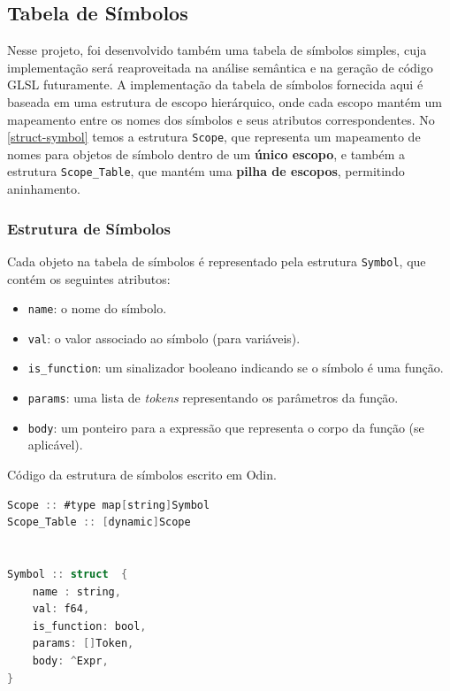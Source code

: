 \subsection{Tabela de Símbolos}


Nesse projeto, foi desenvolvido também uma tabela de símbolos simples, cuja implementação será reaproveitada na análise semântica e na geração de código GLSL futuramente. A implementação da tabela de símbolos fornecida aqui é baseada em uma estrutura de escopo hierárquico, onde cada escopo mantém um mapeamento entre os nomes dos símbolos e seus atributos correspondentes. No \autoref{struct-symbol} temos a estrutura \texttt{Scope}, que representa um mapeamento de nomes para objetos de símbolo dentro de um \textbf{único escopo}, e também a estrutura \texttt{Scope\_Table}, que mantém uma \textbf{pilha de escopos}, permitindo aninhamento.


\subsubsection{Estrutura de Símbolos}


Cada objeto na tabela de símbolos é representado pela estrutura \texttt{Symbol}, que contém os seguintes atributos:
\begin{itemize}
    \item \texttt{name}: o nome do símbolo.
    \item \texttt{val}: o valor associado ao símbolo (para variáveis).
    \item \texttt{is\_function}: um sinalizador booleano indicando se o símbolo é uma função.
    \item \texttt{params}: uma lista de \textit{tokens} representando os parâmetros da função.
    \item \texttt{body}: um ponteiro para a expressão que representa o corpo da função (se aplicável).
\end{itemize}




\begin{codigo}[htb]
\caption{\small Código da estrutura de símbolos escrito em Odin.}
\label{struct-symbol}
\begin{lstlisting}[language=C]
Scope :: #type map[string]Symbol
Scope_Table :: [dynamic]Scope


Symbol :: struct  {
    name : string,
    val: f64,
    is_function: bool,
    params: []Token,
    body: ^Expr,
}

\end{lstlisting}
\end{codigo}


